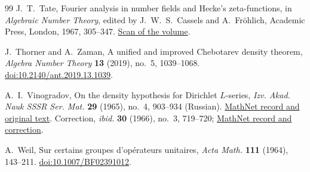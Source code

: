 \begin{thebibliography}{99}
J.~T.~Tate,
Fourier analysis in number fields and Hecke's zeta-functions,
in \emph{Algebraic Number Theory}, edited by J.~W.~S.~Cassels and
A.~Fr\"ohlich, Academic Press, London, 1967, 305--347.
\href{https://math.arizona.edu/~cais/scans/Cassels-Frohlich-Algebraic_Number_Theory.pdf}{Scan of the volume}.

J.~Thorner and A.~Zaman,
A unified and improved Chebotarev density theorem,
\emph{Algebra Number Theory} \textbf{13} (2019), no.~5, 1039--1068.
\href{https://doi.org/10.2140/ant.2019.13.1039}{doi:10.2140/ant.2019.13.1039}.

A.~I.~Vinogradov,
On the density hypothesis for Dirichlet \(L\)-series,
\emph{Izv. Akad. Nauk SSSR Ser. Mat.} \textbf{29} (1965),
no.~4, 903--934 (Russian).
\href{https://www.mathnet.ru/eng/im3080}{MathNet record and original text}.
Correction, \emph{ibid.} \textbf{30} (1966), no.~3, 719--720;
\href{https://www.mathnet.ru/eng/im2856}{MathNet record and correction}.

A.~Weil,
Sur certains groupes d'op\'erateurs unitaires,
\emph{Acta Math.} \textbf{111} (1964), 143--211.
\href{https://doi.org/10.1007/BF02391012}{doi:10.1007/BF02391012}.

\end{thebibliography}
